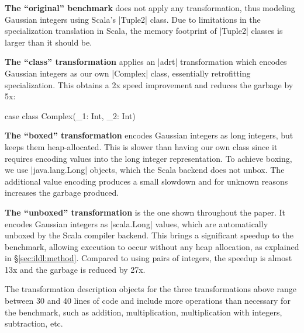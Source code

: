 \noindent
\textbf{The ``original'' benchmark} does not apply any transformation, thus modeling Gaussian integers using Scala's |Tuple2| class. Due to limitations in the specialization \cite{iuli-thesis, specialization-iuli} translation in Scala, the memory footprint of |Tuple2| classes is larger than it should be.


\noindent
\textbf{The ``class'' transformation} applies an |adrt| transformation which encodes Gaussian integers as our own |Complex| class, essentially retrofitting specialization. This obtains a 2x speed improvement and reduces the garbage by 5x:

\begin{lstlisting-nobreak}
case class Complex(_1: Int, _2: Int)
\end{lstlisting-nobreak}


\noindent
\textbf{The ``boxed'' transformation} encodes Gaussian integers as long integers, but keeps them heap-allocated. This is slower than having our own class since it requires encoding values into the long integer representation. To achieve boxing, we use |java.lang.Long| objects, which the Scala backend does not unbox. The additional value encoding produces a small slowdown and for unknown reasons increases the garbage produced.


\noindent
\textbf{The ``unboxed'' transformation} is the one shown throughout the paper. It encodes Gaussian integers as |scala.Long| values, which are automatically unboxed by the Scala compiler backend. This brings a significant speedup to the benchmark, allowing execution to occur without any heap allocation, as explained in \S\ref{sec:ildl:method}. Compared to using pairs of integers, the speedup is almost 13x and the garbage is reduced by
27x.


\noindent
The transformation description objects for the three transformations above range between 30 and 40 lines of code and include more operations than necessary for the benchmark, such as addition, multiplication, multiplication with integers, subtraction, etc.

